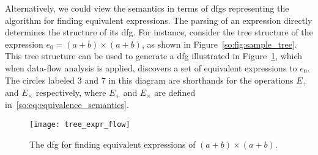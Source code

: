 Alternatively, we could view the semantics in terms of \glspl{dfg} representing
the algorithm for finding equivalent expressions. The parsing of an expression
directly determines the structure of its \gls{dfg}\@. For instance, consider
the tree structure of the expression $e_0 = (a + b) \times (a + b)$, as shown
in Figure~\ref{so:fig:sample_tree}. This tree structure can be used to generate
a \gls{dfg} illustrated in Figure~\ref{so:fig:tree_expr_flow}, which when
data-flow analysis is applied, discovers a set of equivalent expressions to
$e_0$. The circles labeled $3$ and $7$ in this diagram are shorthands for the
operations $E_+$ and $E_\times$ respectively, where $E_+$ and $E_\times$ are
defined in~\eqref{so:eq:equivalence_semantics}.
\begin{figure}[ht]
    \centering
    \texttt{[image: tree\_expr\_flow]}
    \caption{%
        The \acrshort{dfg} for finding equivalent expressions of
        $(a + b) \times (a + b)$.
    }\label{so:fig:tree_expr_flow}
\end{figure}


